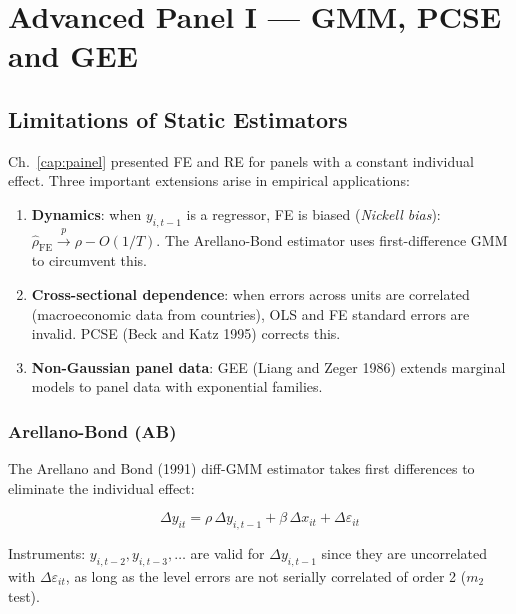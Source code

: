 \chapter{Advanced Panel I — GMM, PCSE and GEE}
\label{cap:painel_avancado}

\section{Limitations of Static Estimators}

Ch.~\ref{cap:painel} presented FE and RE for panels with a constant individual
effect. Three important extensions arise in empirical applications:

\begin{enumerate}
  \item \textbf{Dynamics}: when $y_{i,t-1}$ is a regressor, FE is biased
  (\emph{Nickell bias}): $\hat\rho_{\mathrm{FE}} \xrightarrow{p} \rho - O(1/T)$.
  The Arellano-Bond estimator uses first-difference GMM to circumvent this.
  \item \textbf{Cross-sectional dependence}: when errors across units are
  correlated (macroeconomic data from countries), OLS and FE standard errors are
  invalid. PCSE (Beck and Katz 1995) corrects this.
  \item \textbf{Non-Gaussian panel data}: GEE (Liang and Zeger 1986)
  extends marginal models to panel data with exponential families.
\end{enumerate}

\subsection*{Arellano-Bond (AB)}

The Arellano and Bond (1991) diff-GMM estimator takes first differences
to eliminate the individual effect:

\[
  \Delta y_{it} = \rho\,\Delta y_{i,t-1} + \beta\,\Delta x_{it} + \Delta\varepsilon_{it}
\]

Instruments: $y_{i,t-2}, y_{i,t-3}, \ldots$ are valid for $\Delta y_{i,t-1}$
since they are uncorrelated with $\Delta\varepsilon_{it}$, as long as the
level errors are not serially correlated of order 2 ($m_2$ test).

